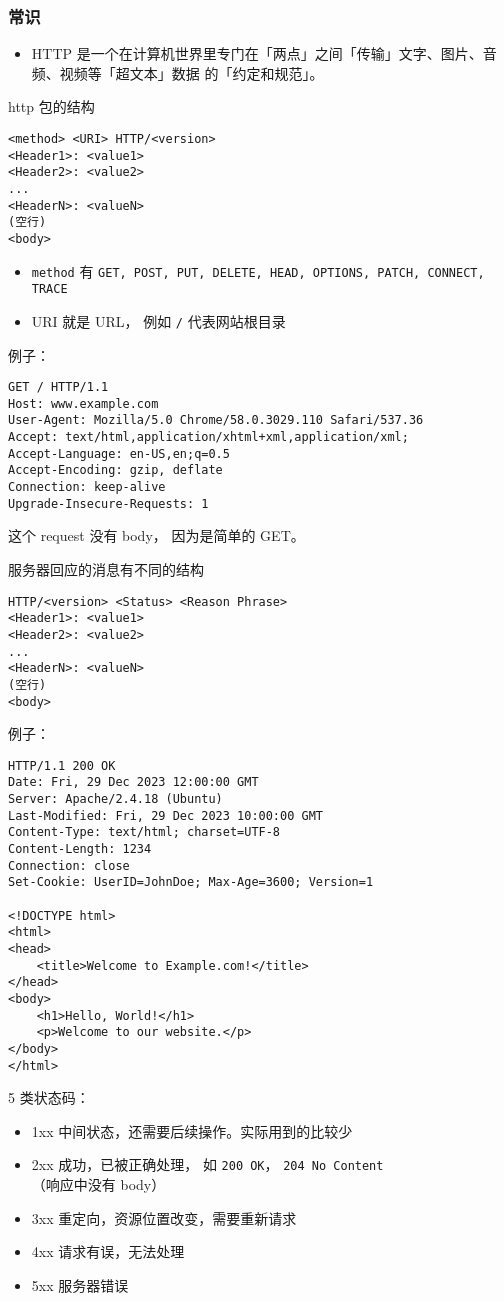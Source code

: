 
\begin{issues}
\issueDraft
\end{issues}

\subsubsection{常识}
\begin{itemize}
\item HTTP 是一个在计算机世界里专门在「两点」之间「传输」文字、图片、音频、视频等「超文本」数据 的「约定和规范」。
\end{itemize}


http 包的结构
\begin{lstlisting}[language=none]
<method> <URI> HTTP/<version>
<Header1>: <value1>
<Header2>: <value2>
...
<HeaderN>: <valueN>
(空行)
<body>
\end{lstlisting}

\begin{itemize}
\item \verb|method| 有 \verb|GET, POST, PUT, DELETE, HEAD, OPTIONS, PATCH, CONNECT, TRACE|
\item URI 就是 URL， 例如 \verb`/` 代表网站根目录
\end{itemize}

例子：
\begin{lstlisting}[language=none]
GET / HTTP/1.1
Host: www.example.com
User-Agent: Mozilla/5.0 Chrome/58.0.3029.110 Safari/537.36
Accept: text/html,application/xhtml+xml,application/xml;
Accept-Language: en-US,en;q=0.5
Accept-Encoding: gzip, deflate
Connection: keep-alive
Upgrade-Insecure-Requests: 1
\end{lstlisting}
这个 request 没有 body， 因为是简单的 GET。

服务器回应的消息有不同的结构
\begin{lstlisting}[language=none]
HTTP/<version> <Status> <Reason Phrase>
<Header1>: <value1>
<Header2>: <value2>
...
<HeaderN>: <valueN>
(空行)
<body>
\end{lstlisting}

例子：
\begin{lstlisting}[language=none]
HTTP/1.1 200 OK
Date: Fri, 29 Dec 2023 12:00:00 GMT
Server: Apache/2.4.18 (Ubuntu)
Last-Modified: Fri, 29 Dec 2023 10:00:00 GMT
Content-Type: text/html; charset=UTF-8
Content-Length: 1234
Connection: close
Set-Cookie: UserID=JohnDoe; Max-Age=3600; Version=1

<!DOCTYPE html>
<html>
<head>
    <title>Welcome to Example.com!</title>
</head>
<body>
    <h1>Hello, World!</h1>
    <p>Welcome to our website.</p>
</body>
</html>
\end{lstlisting}

5 类状态码：
\begin{itemize}
\item 1xx 中间状态，还需要后续操作。实际用到的比较少
\item 2xx 成功，已被正确处理， 如 \verb`200 OK`， \verb`204 No Content`（响应中没有 body）
\item 3xx 重定向，资源位置改变，需要重新请求
\item 4xx 请求有误，无法处理
\item 5xx 服务器错误
\end{itemize}

